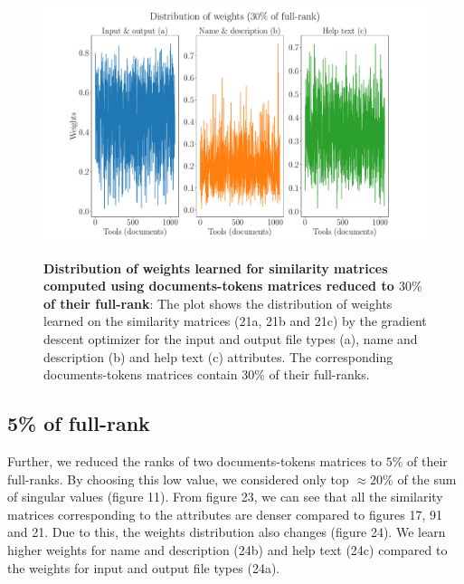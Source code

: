 \begin{figure}[h]
\begin{centering}
    {\includegraphics[scale=0.37]{figures/Weights_030.pdf}}
    \caption[Distribution of weights learned for similarity matrices computed using documents-tokens matrices reduced to $30\%$ of their full-rank]{\textbf{Distribution of weights learned for similarity matrices computed using documents-tokens matrices reduced to $30\%$ of their full-rank}: The plot shows the distribution of weights learned on the similarity matrices (21a, 21b and 21c) by the gradient descent optimizer for the input and output file types (a), name and description (b) and help text (c) attributes. The corresponding documents-tokens matrices contain $30\%$ of their full-ranks.}
\end{centering}
\end{figure}

\subsection{5\% of full-rank}
Further, we reduced the ranks of two documents-tokens matrices to $5\%$ of their full-ranks. By choosing this low value, we considered only top $\approx 20\%$ of the sum of singular values (figure 11). From figure 23, we can see that all the similarity matrices corresponding to the attributes are denser compared to figures 17, 91 and 21. Due to this, the weights distribution also changes (figure 24). We learn higher weights for name and description (24b) and help text (24c) compared to the weights for input and output file types (24a).

